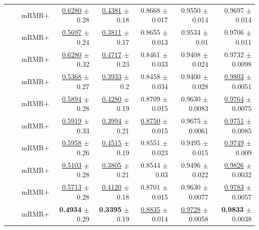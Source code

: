 \begin{longtable}{llp{}rrrrr}
 &  & mRMR+ & \underline{0.6280} {\scriptsize $\pm$ 0.28} & \underline{0.4381} {\scriptsize $\pm$ 0.18} & 0.8668 {\scriptsize $\pm$ 0.017} & 0.9550 {\scriptsize $\pm$ 0.014} & 0.9697 {\scriptsize $\pm$ 0.014} \\
 &  & mRMR+ & \underline{0.5697} {\scriptsize $\pm$ 0.24} & \underline{0.3811} {\scriptsize $\pm$ 0.17} & 0.8655 {\scriptsize $\pm$ 0.013} & 0.9534 {\scriptsize $\pm$ 0.01} & 0.9706 {\scriptsize $\pm$ 0.011} \\
 &  & mRMR+ & \underline{0.6280} {\scriptsize $\pm$ 0.32} & \underline{0.4717} {\scriptsize $\pm$ 0.23} & 0.8461 {\scriptsize $\pm$ 0.033} & 0.9408 {\scriptsize $\pm$ 0.024} & 0.9732 {\scriptsize $\pm$ 0.0098} \\
 &  & mRMR+ & \underline{0.5368} {\scriptsize $\pm$ 0.27} & \underline{0.3933} {\scriptsize $\pm$ 0.2} & 0.8458 {\scriptsize $\pm$ 0.034} & 0.9400 {\scriptsize $\pm$ 0.028} & \underline{0.9803} {\scriptsize $\pm$ 0.0051} \\
 &  & mRMR+ & \underline{0.5894} {\scriptsize $\pm$ 0.28} & \underline{0.4280} {\scriptsize $\pm$ 0.19} & 0.8709 {\scriptsize $\pm$ 0.015} & 0.9630 {\scriptsize $\pm$ 0.0083} & \underline{0.9764} {\scriptsize $\pm$ 0.0075} \\
 &  & mRMR+ & \underline{0.5919} {\scriptsize $\pm$ 0.33} & \underline{0.3994} {\scriptsize $\pm$ 0.21} & \underline{0.8750} {\scriptsize $\pm$ 0.015} & 0.9675 {\scriptsize $\pm$ 0.0061} & \underline{0.9751} {\scriptsize $\pm$ 0.0085} \\
 &  & mRMR+ & \underline{0.5958} {\scriptsize $\pm$ 0.26} & \underline{0.4515} {\scriptsize $\pm$ 0.19} & 0.8551 {\scriptsize $\pm$ 0.023} & 0.9495 {\scriptsize $\pm$ 0.015} & \underline{0.9749} {\scriptsize $\pm$ 0.009} \\
 &  & mRMR+ & \underline{0.5103} {\scriptsize $\pm$ 0.28} & \underline{0.3805} {\scriptsize $\pm$ 0.21} & 0.8544 {\scriptsize $\pm$ 0.03} & 0.9496 {\scriptsize $\pm$ 0.022} & \underline{0.9826} {\scriptsize $\pm$ 0.0032} \\
 &  & mRMR+ & \underline{0.5713} {\scriptsize $\pm$ 0.28} & \underline{0.4120} {\scriptsize $\pm$ 0.18} & 0.8701 {\scriptsize $\pm$ 0.015} & 0.9630 {\scriptsize $\pm$ 0.0077} & \underline{0.9783} {\scriptsize $\pm$ 0.0057} \\
 &  & mRMR+ & \textbf{0.4934} {\scriptsize $\pm$ 0.29} & \textbf{0.3395} {\scriptsize $\pm$ 0.19} & \underline{0.8835} {\scriptsize $\pm$ 0.014} & \underline{0.9728} {\scriptsize $\pm$ 0.0058} & \textbf{0.9833} {\scriptsize $\pm$ 0.0038} \\

\end{longtable}
